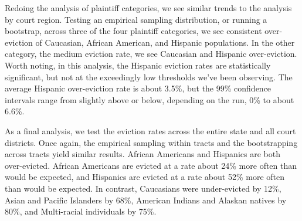 \par Redoing the analysis of plaintiff categories, we see similar trends to the analysis by court region.  Testing an empirical sampling distribution, or running a bootstrap, across three of the four plaintiff categories, we see consistent over-eviction of Caucasian, African American, and Hispanic populations.  In the other category, the medium eviction rate, we see Caucasian and Hispanic over-eviction.  Worth noting, in this analysis, the Hispanic eviction rates are statistically significant, but not at the exceedingly low thresholds we've been observing.  The average Hispanic over-eviction rate is about 3.5\%, but the 99\% confidence intervals range from slightly above or below, depending on the run, 0\% to about 6.6\%.

\par As a final analysis, we test the eviction rates across the entire state and all court districts.  Once again, the empirical sampling within tracts and the bootstrapping across tracts yield similar results.  African Americans and Hispanics are both over-evicted.  African Americans are evicted at a rate about 24\% more often than would be expected, and Hispanics are evicted at a rate about 52\% more often than would be expected.  In contrast, Caucasians were under-evicted by 12\%, Asian and Pacific Islanders by 68\%, American Indians and Alaskan natives by 80\%, and Multi-racial individuals by 75\%.

